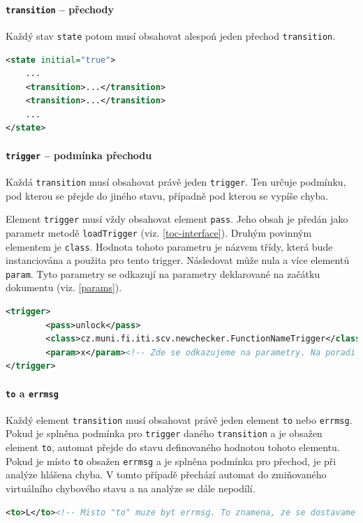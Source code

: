 \documentclass[11pt,final,oneside]{fithesis}
\begin{document}
\paragraph[transition]{\texttt{transition} -- přechody}
Každý stav \texttt{state} potom musí obsahovat alespoň jeden přechod \texttt{transition}. 


\begin{lstlisting}[language=XML,caption=Zápis elementů \texttt{transition}]
<state initial="true">
    ...
	<transition>...</transition>
    <transition>...</transition>
	...
</state>
\end{lstlisting}

\paragraph[trigger]{\texttt{trigger} -- podmínka přechodu}
Každá \texttt{transition} musí obsahovat právě jeden \texttt{trigger}. Ten určuje podmínku, pod kterou se přejde do jiného stavu, případně pod kterou se vypíše chyba.


Element \texttt{trigger} musí vždy obsahovat element \texttt{pass}. Jeho obsah je předán jako parametr metodě \texttt{loadTrigger} (viz. \ref{toc-interface}). Druhým povinným elementem je \texttt{class}. Hodnota tohoto parametru je názvem třídy, která bude instanciována a použita pro tento trigger. Následovat může nula a více elementů \texttt{param}. Tyto parametry se odkazují na parametry deklarované na začátku dokumentu (viz. \ref{params}).

\begin{lstlisting}[language=XML,caption=Zápis \texttt{trigger}]
<trigger>
        <pass>unlock</pass>
        <class>cz.muni.fi.iti.scv.newchecker.FunctionNameTrigger</class>
        <param>x</param><!-- Zde se odkazujeme na parametry. Na poradi zalezi. -->
</trigger>
\end{lstlisting}


\paragraph[to a errmsg]{\texttt{to} a \texttt{errmsg}}
Každý element \texttt{transition} musí obsahovat právě jeden element \texttt{to} nebo \texttt{errmsg}. Pokud je splněna podmínka pro \texttt{trigger} daného \texttt{transition} a je obsažen element \texttt{to}, automat přejde do stavu definovaného hodnotou tohoto elementu. Pokud je místo \texttt{to} obsažen \texttt{errmsg} a je splněna podmínka pro přechod, je při analýze hlášena chyba. V tomto případě přechází automat do zmiňovaného virtuálního chybového stavu a na analýze se dále nepodílí.
\begin{lstlisting}[language=XML,caption=Zápis \texttt{to}]
<to>L</to><!-- Misto "to" muze byt errmsg. To znamena, ze se dostavame do chyboveho stavu. Automat konci -->
\end{lstlisting}
\end{document}
